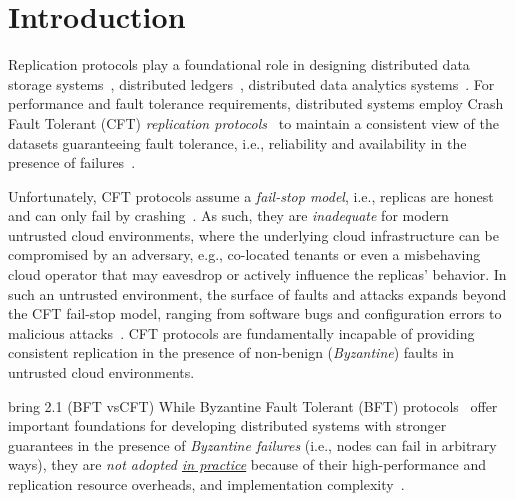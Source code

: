 \section{Introduction}
\label{sec:introduction}

\myparagraph{}

 Replication protocols play a foundational role in designing distributed data storage systems~\cite{10.14778/3007263.3007267, 10.14778/2002938.2002939, zippydb, bankDB, NetflixDB, GEDB, HESSDB}, distributed ledgers~\cite{baasAlibaba, baasAWS, baasAzure, baasIBM, baasOracle}, distributed data analytics systems~\cite{NetflixDB}. For performance and fault tolerance requirements, distributed systems employ Crash Fault Tolerant (CFT) {\em replication protocols}~\cite{raft,chain-replication, 10.5555/1855807.1855818, Reed2008AST, 10.5555/800253.807732, lynch:1997, 10.1145/279227.279229, Hermes:2020} to maintain a consistent view of the datasets guaranteeing fault tolerance, i.e., reliability and availability in the presence of failures~\cite{zippydb, dynamo, lakshman2009, redis, rocksdb, leveldb, memcached2004, bfthyperledger}.





Unfortunately, CFT protocols assume a {\em fail-stop model}, i.e., replicas are honest and can only fail by crashing~\cite{delporte}. As such, they are {\em inadequate} for modern untrusted cloud environments, where the underlying cloud infrastructure can be compromised by an adversary, e.g., co-located tenants or even a misbehaving cloud operator that may eavesdrop or actively influence the replicas' behavior. In such an untrusted environment, the surface of faults and attacks expands beyond the CFT fail-stop model, ranging from software bugs and configuration errors to malicious attacks~\cite{Gunawi_bugs-in-the-cloud, Shinde2016, hahnel2017high}. CFT protocols are fundamentally incapable of providing consistent replication in the presence of non-benign ({\em Byzantine}) faults in untrusted cloud environments.


bring 2.1 (BFT vsCFT)
While Byzantine Fault Tolerant (BFT) protocols~\cite{Lamport:1982} offer important foundations for developing distributed systems with stronger guarantees in the presence of {\em Byzantine failures} (i.e., nodes can fail in arbitrary ways), they are {\em not adopted \underline{in practice}} because of their high-performance and replication resource overheads, and implementation complexity~\cite{visigoth-eurosys}.

